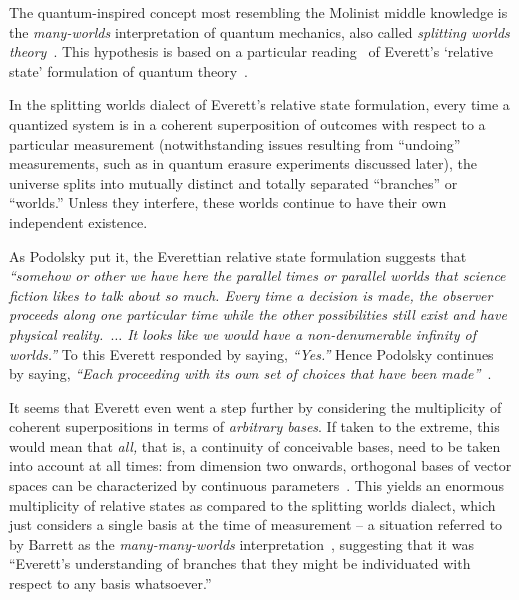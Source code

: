 \documentclass[%
  twocolumn,
 showpacs,
 showkeys,
 preprintnumbers,
 amsmath,amssymb,
 aps,
  pra,
  longbibliography,
 ]{revtex4-1}
\begin{document}
The quantum-inspired concept most resembling the Molinist middle knowledge is the {\em many-worlds}
interpretation of quantum mechanics, also called {\em splitting worlds theory}~\cite{everett-thesis}.
This hypothesis is based on a particular reading~\cite{Barrett-2011,everett-collw}
of Everett's `relative state' formulation of quantum theory~\cite{everett,sep-qm-everett}.

In the splitting worlds dialect of Everett's relative state formulation,
every time a quantized system is in a coherent superposition of outcomes with respect to a particular measurement
(notwithstanding issues resulting from ``undoing'' measurements, such as in quantum erasure experiments discussed later),
the universe splits into mutually distinct and totally separated ``branches'' or ``worlds.''
Unless they interfere, these worlds continue to have their own independent existence.

As Podolsky put it, the Everettian relative state formulation suggests that {\em ``somehow or other we
have here the parallel times or parallel worlds that science
fiction likes to talk about so much. Every time a decision is
made, the observer proceeds along one particular time while the
other possibilities still exist and have physical reality.~$\ldots$
 It looks like we would have a non-denumerable infinity
of worlds.''}
To this Everett responded by saying, {\em ``Yes.''}
Hence Podolsky continues by saying, {\em ``Each proceeding with its own set of choices
that have been made''}~\cite[pp.~89,90]{podolsky-Xavier-conference}.


It seems that Everett even went a step further by considering the multiplicity of coherent superpositions in terms of
{\em arbitrary bases}.
If taken to the extreme, this would mean that {\em all,} that is, a continuity of conceivable bases, need to be taken into account at all times:
from dimension two onwards, orthogonal bases of vector spaces can be characterized by continuous parameters~\cite{Schwinger.60,murnaghan}.
This yields an enormous multiplicity of relative states as compared to the splitting worlds dialect, which
just considers a single  basis at the time of measurement --
a situation referred to by Barrett as the {\em many-many-worlds} interpretation~\cite[p.~289]{Barrett-2011},
suggesting that it was ``Everett's understanding of
branches that they might be individuated with respect to any basis whatsoever.''
\end{document}
